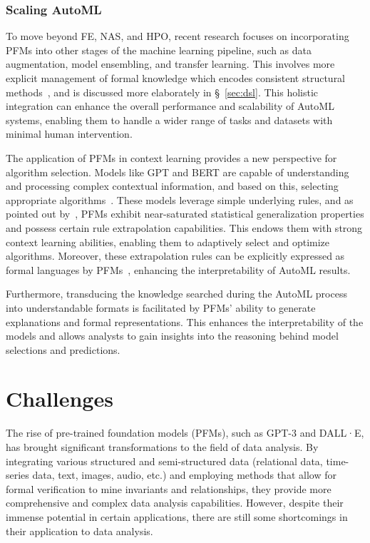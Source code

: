   \subsubsection{Scaling AutoML}\label{sec:scaling_automl}
  
  To move beyond FE, NAS, and HPO, recent research focuses on incorporating PFMs into other stages of the machine learning pipeline, such as data augmentation, model ensembling, and transfer learning. This involves more explicit management of formal knowledge which encodes consistent structural methods~\cite{SongY00024, HsuMTW23}, and is discussed more elaborately in \S~\ref{sec:dsl}. This holistic integration can enhance the overall performance and scalability of AutoML systems, enabling them to handle a wider range of tasks and datasets with minimal human intervention.
  
  The application of PFMs in context learning provides a new perspective for algorithm selection. Models like GPT and BERT are capable of understanding and processing complex contextual information, and based on this, selecting appropriate algorithms~\cite{009brown2020language, EoTGE}. These models leverage simple underlying rules, and as pointed out by~\cite{reizingerposition}, PFMs exhibit near-saturated statistical generalization properties and possess certain rule extrapolation capabilities. This endows them with strong context learning abilities, enabling them to adaptively select and optimize algorithms. Moreover, these extrapolation rules can be explicitly expressed as formal languages by PFMs~\cite{cheng2022binding}, enhancing the interpretability of AutoML results.
  
  Furthermore, transducing the knowledge searched during the AutoML process into understandable formats is facilitated by PFMs' ability to generate explanations and formal representations. This enhances the interpretability of the models and allows analysts to gain insights into the reasoning behind model selections and predictions.
  
  \section{Challenges}
  
  The rise of pre-trained foundation models (PFMs), such as GPT-3 and DALL·E, has brought significant transformations to the field of data analysis. By integrating various structured and semi-structured data (relational data, time-series data, text, images, audio, etc.) and employing methods that allow for formal verification to mine invariants and relationships, they provide more comprehensive and complex data analysis capabilities. However, despite their immense potential in certain applications, there are still some shortcomings in their application to data analysis.
  
